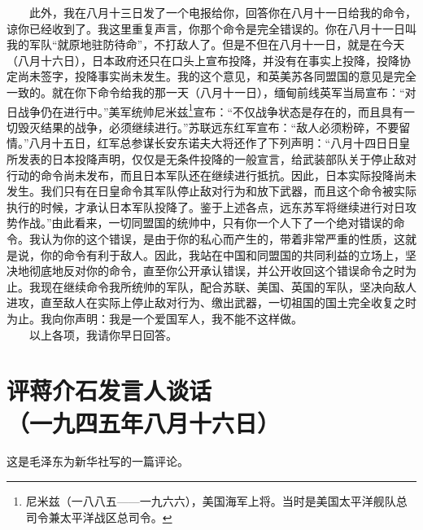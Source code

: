\documentclass[cn,11pt,chinese]{elegantbook}
\def\myformat#1{\hfil\hfil #1}
\begin{document}
　　此外，我在八月十三日发了一个电报给你，回答你在八月十一日给我的命令，谅你已经收到了。我这里重复声言，你那个命令是完全错误的。你在八月十一日叫我的军队“就原地驻防待命”，不打敌人了。但是不但在八月十一日，就是在今天（八月十六日），日本政府还只在口头上宣布投降，并没有在事实上投降，投降协定尚未签字，投降事实尚未发生。我的这个意见，和英美苏各同盟国的意见是完全一致的。就在你下命令给我的那一天（八月十一日），缅甸前线英军当局宣布：“对日战争仍在进行中。”美军统帅尼米兹\footnote[7]{ 尼米兹（一八八五——一九六六），美国海军上将。当时是美国太平洋舰队总司令兼太平洋战区总司令。}宣布：“不仅战争状态是存在的，而且具有一切毁灭结果的战争，必须继续进行。”苏联远东红军宣布：“敌人必须粉碎，不要留情。”八月十五日，红军总参谋长安东诺夫大将还作了下列声明：“八月十四日日皇所发表的日本投降声明，仅仅是无条件投降的一般宣言，给武装部队关于停止敌对行动的命令尚未发布，而且日本军队还在继续进行抵抗。因此，日本实际投降尚未发生。我们只有在日皇命令其军队停止敌对行为和放下武器，而且这个命令被实际执行的时候，才承认日本军队投降了。鉴于上述各点，远东苏军将继续进行对日攻势作战。”由此看来，一切同盟国的统帅中，只有你一个人下了一个绝对错误的命令。我认为你的这个错误，是由于你的私心而产生的，带着非常严重的性质，这就是说，你的命令有利于敌人。因此，我站在中国和同盟国的共同利益的立场上，坚决地彻底地反对你的命令，直至你公开承认错误，并公开收回这个错误命令之时为止。我现在继续命令我所统帅的军队，配合苏联、美国、英国的军队，坚决向敌人进攻，直至敌人在实际上停止敌对行为、缴出武器，一切祖国的国土完全收复之时为止。我向你声明：我是一个爱国军人，我不能不这样做。\\
　　以上各项，我请你早日回答。\\
\newpage\section*{\myformat{评蒋介石发言人谈话}\\\myformat{（一九四五年八月十六日）}}
\begin{introduction}\item  这是毛泽东为新华社写的一篇评论。\end{introduction}
\end{document}
